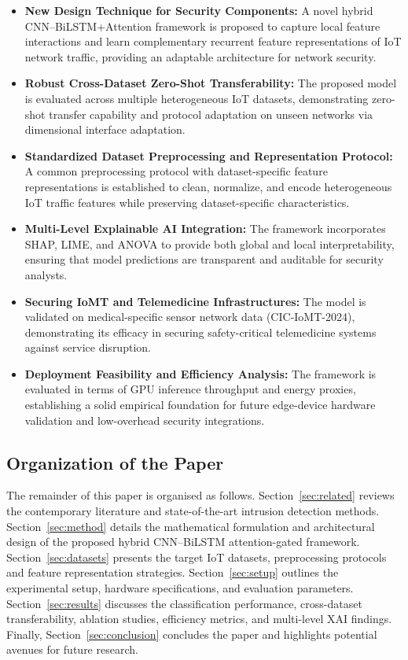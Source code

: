 \documentclass[a4paper,fleqn]{cas-sc}
\begin{document}
\begin{itemize}
    \item \textbf{New Design Technique for Security Components:} A novel hybrid CNN--BiLSTM+Attention framework is proposed to capture local feature interactions and learn complementary recurrent feature representations of IoT network traffic, providing an adaptable architecture for network security.

    \item \textbf{Robust Cross-Dataset Zero-Shot Transferability:} The proposed model is evaluated across multiple heterogeneous IoT datasets, demonstrating zero-shot transfer capability and protocol adaptation on unseen networks via dimensional interface adaptation.

    \item \textbf{Standardized Dataset Preprocessing and Representation Protocol:} A common preprocessing protocol with dataset-specific feature representations is established to clean, normalize, and encode heterogeneous IoT traffic features while preserving dataset-specific characteristics.

    \item \textbf{Multi-Level Explainable AI Integration:} The framework incorporates SHAP, LIME, and ANOVA to provide both global and local interpretability, ensuring that model predictions are transparent and auditable for security analysts.

    \item \textbf{Securing IoMT and Telemedicine Infrastructures:} The model is validated on medical-specific sensor network data (CIC-IoMT-2024), demonstrating its efficacy in securing safety-critical telemedicine systems against service disruption.

    \item \textbf{Deployment Feasibility and Efficiency Analysis:} The framework is evaluated in terms of GPU inference throughput and energy proxies, establishing a solid empirical foundation for future edge-device hardware validation and low-overhead security integrations.
\end{itemize}

\subsection{Organization of the Paper}

The remainder of this paper is organised as follows.  Section~\ref{sec:related} reviews the contemporary literature and state-of-the-art intrusion detection methods. Section~\ref{sec:method} details the mathematical formulation and architectural design of the proposed hybrid CNN--BiLSTM attention-gated framework. Section~\ref{sec:datasets} presents the target IoT datasets, preprocessing protocols and feature representation strategies. Section~\ref{sec:setup} outlines the experimental setup, hardware specifications, and evaluation parameters. Section~\ref{sec:results} discusses the classification performance, cross-dataset transferability, ablation studies, efficiency metrics, and multi-level XAI findings. Finally, Section~\ref{sec:conclusion} concludes the paper and highlights potential avenues for future research. 
\end{document}
